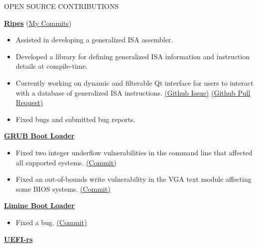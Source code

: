 \documentclass{resume} %
\begin{document}
\begin{rSection}{OPEN SOURCE CONTRIBUTIONS}
	
	\vspace{-1.25em}
	\item
	\href{https://github.com/mortbopet/Ripes}{\textbf{Ripes}}
	(\href{https://github.com/mortbopet/Ripes/commits/master/?author=raccog}{My Commits})
	\vspace{-.75em}
	\begin{itemize}
		\itemsep -8pt{}
		\item Assisted in developing a generalized ISA assembler.
		\item Developed a library for defining generalized ISA information and instruction details at compile-time.
		\item Currently working on dynamic and filterable Qt interface for users to interact with a database of generalized ISA instructions.
		\href{https://github.com/mortbopet/Ripes/issues/297}{(Github Issue)}
		\href{https://github.com/mortbopet/Ripes/pull/329}{(Github Pull Request)}
		\item Fixed bugs and submitted bug reports.
	\end{itemize}
	\vspace{-.75em}
	\item  \href{https://git.savannah.gnu.org/cgit/grub.git}{\textbf{GRUB Boot Loader}}
	\vspace{-.75em}
	\begin{itemize}
		\itemsep -8pt{}
		\item Fixed two integer underflow vulnerabilities in the command line that affected all supported systems.
		\href{https://git.savannah.gnu.org/gitweb/?p=grub.git;a=commit;h=77afd25f8065bfbf5cc7848855006cd5260aeb9f}{(Commit)}
		\item Fixed an out-of-bounds write vulnerability in the VGA text module affecting some BIOS systems.
		\href{https://git.savannah.gnu.org/gitweb/?p=grub.git;a=commit;h=108a3865f43330b581d35b9cf6ecb1e0a1da5d49}{(Commit)}
	\end{itemize}
	\vspace{-.75em}
	\item \href{https://github.com/limine-bootloader/limine}{\textbf{Limine Boot Loader}}
	\vspace{-.75em}
	\begin{itemize}
		\itemsep -8pt{}
		\item Fixed a bug. \href{https://github.com/limine-bootloader/limine/commit/07d8dd2c68aea2bd4a03e8b69a521c67abc1d618}{(Commit)}
	\end{itemize}
	\vspace{-.75em}
	\item \href{https://github.com/rust-osdev/uefi-rs}{\textbf{UEFI-rs}}
	\vspace{-.75em}
	\begin{itemize}
		\itemsep -8pt{}
	

\end{itemize}
\end{rSection}
\end{document}
